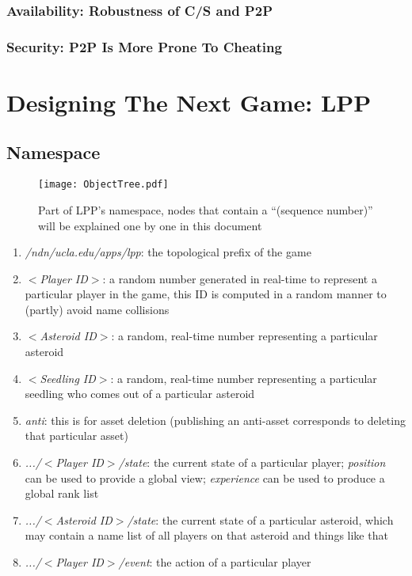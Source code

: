 \documentclass{article}
\begin{document}
\subsubsection{Availability: Robustness of C/S and P2P}

\subsubsection{Security: P2P Is More Prone To Cheating}

\section{Designing The Next Game: LPP}
\label{dslpp}

\subsection{Namespace}

\begin{figure}[htbp]
\begin{center}
\texttt{[image: ObjectTree.pdf]}
\caption{Part of LPP's namespace, nodes that contain a ``(sequence number)'' will be explained one by one in this document}
\label{ns}
\end{center}
\end{figure}

\begin{enumerate}
\item \emph{/ndn/ucla.edu/apps/lpp}: the topological prefix of the game
\item \emph{$<$Player ID$>$}: a random number generated in real-time to represent a particular player in the game, this ID is computed in a random manner to (partly) avoid name collisions
\item \emph{$<$Asteroid ID$>$}: a random, real-time number representing a particular asteroid
\item \emph{$<$Seedling ID$>$}: a random, real-time number representing a particular seedling who comes out of a particular asteroid
\item \emph{anti}: this is for asset deletion (publishing an anti-asset corresponds to deleting that particular asset)
\item \emph{.../$<$Player ID$>$/state}: the current state of a particular player; \emph{position} can be used to provide a global view; \emph{experience} can be used to produce a global rank list
\item \emph{.../$<$Asteroid ID$>$/state}: the current state of a particular asteroid, which may contain a name list of all players on that asteroid and things like that
\item \emph{.../$<$Player ID$>$/event}: the action of a particular player
\end{enumerate}
\end{document}
